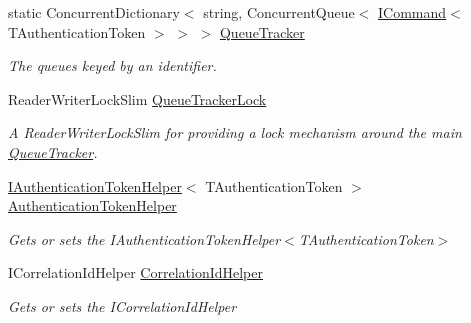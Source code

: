 \begin{DoxyCompactItemize}
\item 
static Concurrent\+Dictionary$<$ string, Concurrent\+Queue$<$ \hyperlink{interfaceCqrs_1_1Commands_1_1ICommand}{I\+Command}$<$ T\+Authentication\+Token $>$ $>$ $>$ \hyperlink{classCqrs_1_1Bus_1_1QueuedCommandBusReceiver_a2fc62989429929acd8ea66808a8c4a78_a2fc62989429929acd8ea66808a8c4a78}{Queue\+Tracker}
\begin{DoxyCompactList}\small\item\em The queues keyed by an identifier. \end{DoxyCompactList}\item 
Reader\+Writer\+Lock\+Slim \hyperlink{classCqrs_1_1Bus_1_1QueuedCommandBusReceiver_ac633e2d140fc90fab100acba4afa136b_ac633e2d140fc90fab100acba4afa136b}{Queue\+Tracker\+Lock}
\begin{DoxyCompactList}\small\item\em A Reader\+Writer\+Lock\+Slim for providing a lock mechanism around the main \hyperlink{classCqrs_1_1Bus_1_1QueuedCommandBusReceiver_a2fc62989429929acd8ea66808a8c4a78_a2fc62989429929acd8ea66808a8c4a78}{Queue\+Tracker}. \end{DoxyCompactList}\item 
\hyperlink{interfaceCqrs_1_1Authentication_1_1IAuthenticationTokenHelper}{I\+Authentication\+Token\+Helper}$<$ T\+Authentication\+Token $>$ \hyperlink{classCqrs_1_1Bus_1_1QueuedCommandBusReceiver_a809cb92ece6c52bbbe3abc347be0470d_a809cb92ece6c52bbbe3abc347be0470d}{Authentication\+Token\+Helper}
\begin{DoxyCompactList}\small\item\em Gets or sets the I\+Authentication\+Token\+Helper$<$\+T\+Authentication\+Token$>$ \end{DoxyCompactList}\item 
I\+Correlation\+Id\+Helper \hyperlink{classCqrs_1_1Bus_1_1QueuedCommandBusReceiver_a4cf8781cab9cb844892eb032cfca773f_a4cf8781cab9cb844892eb032cfca773f}{Correlation\+Id\+Helper}
\begin{DoxyCompactList}\small\item\em Gets or sets the I\+Correlation\+Id\+Helper \end{DoxyCompactList}\item 

\end{DoxyCompactItemize}
